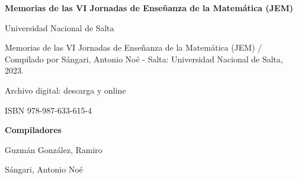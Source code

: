 \begin{center}
	\LARGE \bfseries \sffamily
	Memorias de las VI Jornadas de Enseñanza de la Matemática (JEM)
\end{center}

\vspace*{2.5mm}

\begin{center}
	\begin{tcolorbox}[colback=white, arc=0mm, width=10cm, boxrule=0.5pt]
		\footnotesize
		Universidad Nacional de Salta
		
		\hspace*{1em} Memorias de las VI Jornadas de Enseñanza de la Matemática (JEM) / Compilado por Sángari, Antonio Noé - Salta: Universidad Nacional de Salta, 2023.
		
		\vspace*{1em}
		
		\hspace*{1em} Archivo digital: descarga y online
		
		\hspace*{1em} ISBN 978-987-633-615-4		
	\end{tcolorbox}
\end{center}

\vspace*{2.5mm}

\begin{center}
	\sffamily \Large \bfseries Compiladores
	
	\large \normalfont
	Guzmán González, Ramiro 
	
	Sángari, Antonio Noé 
\end{center}

